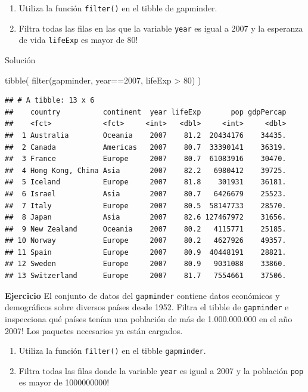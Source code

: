 \documentclass[
]{book}
\newenvironment{Shaded}{\begin{snugshade}}{\end{snugshade}}
\newcommand{\DecValTok}[1]{\textcolor[rgb]{0.00,0.00,0.81}{#1}}
\newcommand{\FunctionTok}[1]{\textcolor[rgb]{0.00,0.00,0.00}{#1}}
\newcommand{\NormalTok}[1]{#1}
\newcommand{\SpecialCharTok}[1]{\textcolor[rgb]{0.00,0.00,0.00}{#1}}
\providecommand{\tightlist}{%
  \setlength{\itemsep}{0pt}\setlength{\parskip}{0pt}}
\begin{document}
\begin{enumerate}
\def\labelenumi{\arabic{enumi}.}
\tightlist
\item
  Utiliza la función \texttt{filter()} en el tibble de gapminder.
\item
  Filtra todas las filas en las que la variable \texttt{year} es igual a 2007 y la esperanza de vida \texttt{lifeExp} es mayor de 80!
\end{enumerate}

Solución

\begin{Shaded}
\begin{Highlighting}[]
\FunctionTok{tibble}\NormalTok{(}
\FunctionTok{filter}\NormalTok{(gapminder, year}\SpecialCharTok{==}\DecValTok{2007}\NormalTok{, lifeExp }\SpecialCharTok{\textgreater{}} \DecValTok{80}\NormalTok{)}
\NormalTok{)}
\end{Highlighting}
\end{Shaded}

\begin{verbatim}
## # A tibble: 13 x 6
##    country          continent  year lifeExp       pop gdpPercap
##    <fct>            <fct>     <int>   <dbl>     <int>     <dbl>
##  1 Australia        Oceania    2007    81.2  20434176    34435.
##  2 Canada           Americas   2007    80.7  33390141    36319.
##  3 France           Europe     2007    80.7  61083916    30470.
##  4 Hong Kong, China Asia       2007    82.2   6980412    39725.
##  5 Iceland          Europe     2007    81.8    301931    36181.
##  6 Israel           Asia       2007    80.7   6426679    25523.
##  7 Italy            Europe     2007    80.5  58147733    28570.
##  8 Japan            Asia       2007    82.6 127467972    31656.
##  9 New Zealand      Oceania    2007    80.2   4115771    25185.
## 10 Norway           Europe     2007    80.2   4627926    49357.
## 11 Spain            Europe     2007    80.9  40448191    28821.
## 12 Sweden           Europe     2007    80.9   9031088    33860.
## 13 Switzerland      Europe     2007    81.7   7554661    37506.
\end{verbatim}

\textbf{Ejercicio}
El conjunto de datos del \texttt{gapminder} contiene datos económicos y demográficos sobre diversos países desde 1952. Filtra el tibble de \texttt{gapminder} e inspecciona qué países tenían una población de más de 1.000.000.000 en el año 2007! Los paquetes necesarios ya están cargados.

\begin{enumerate}
\def\labelenumi{\arabic{enumi}.}
\tightlist
\item
  Utiliza la función \texttt{filter()} en el tibble \texttt{gapminder}.
\item
  Filtra todas las filas donde la variable \texttt{year} es igual a 2007 y la población \texttt{pop} es mayor de 1000000000!
\end{enumerate}
\end{document}
